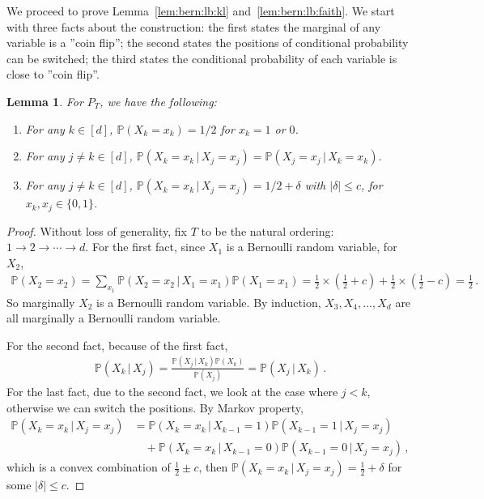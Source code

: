 \documentclass{article}
\newtheorem{lemma}[theorem]{Lemma}
\theoremstyle{definition}
\theoremstyle{definition}
\theoremstyle{definition}
\theoremstyle{definition}
\theoremstyle{definition}
\theoremstyle{definition}
\theoremstyle{remark}
\theoremstyle{remark}
\newcommand{\prob}{\mathbb{P}}
\newcommand{\given}{\,|\,}
\newcommand{\dd}{d}
\begin{document}
We proceed to prove Lemma~\ref{lem:bern:lb:kl} and~\ref{lem:bern:lb:faith}.
We start with three facts about the construction: the first states the marginal of any variable is a ''coin flip''; the second states the positions of conditional probability can be switched; the third states the conditional probability of each variable is close to ''coin flip''.
\begin{lemma}\label{lem:bern:lb:fact}
For $P_{T}$, we have the following:
\begin{enumerate}
    \item For any $k\in[\dd]$, $\prob(X_k=x_k)=1/2$ for $x_k=1$ or $0$.
    \item For any $j\ne k\in[\dd]$, $\prob(X_k=x_k\given X_j=x_j)=\prob(X_j=x_j\given X_k=x_k)$.
    \item For any $j\ne k\in[\dd]$, $\prob(X_k=x_k\given X_j=x_j) = 1/2 + \delta$ with $|\delta|\le c$, for $x_k,x_j\in \{0,1\}$.
\end{enumerate}  
\end{lemma}
\begin{proof}
Without loss of generality, fix $T$ to be the natural ordering: $1\to 2\to \cdots \to \dd$. For the first fact, since $X_1$ is a Bernoulli random variable, for $X_2$, 
\begin{align*}
    \prob(X_2 = x_2) = \sum_{x_1}\prob(X_2 = x_2 \given X_1 = x_1)\prob(X_1=x_1) = \frac{1}{2} \times (\frac{1}{2} + c) + \frac{1}{2} \times (\frac{1}{2} - c) = \frac{1}{2} \,.
\end{align*}
So marginally $X_2$ is a Bernoulli random variable. By induction, $X_3, X_4,\ldots, X_d$ are all marginally a Bernoulli random variable.

For the second fact, because of the first fact,
\begin{align*}
    \prob(X_k\given X_j) = \frac{\prob(X_j\given X_k)\prob(X_k)}{\prob(X_j)} =\prob(X_j\given X_k) \,.
\end{align*}
For the last fact, due to the second fact, we look at the case where $j < k$, otherwise we can switch the positions. By Markov property,
\begin{align*}
    \prob(X_k=x_k\given X_j=x_j) 
    &=\prob(X_k=x_k\given X_{k-1}=1) \prob(X_{k-1}=1\given X_{j}=x_{j}) \\
    &\quad + \prob(X_k=x_k\given X_{k-1}=0)\prob(X_{k-1}=0\given X_{j}=x_{j}) \,,
\end{align*}
which is a convex combination of $\frac{1}{2}\pm c$, then $\prob(X_k=x_k\given X_j=x_j) = \frac{1}{2} + \delta $ for some $|\delta|\le c$.
\end{proof}
\end{document}

